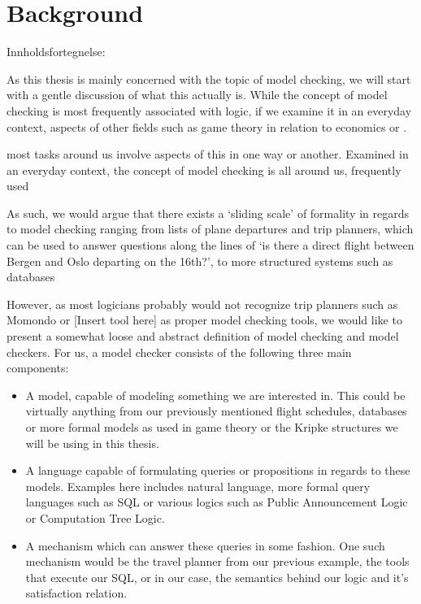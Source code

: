 \section{Background}\label{sec:back}

Innholdsfortegnelse:


As this thesis is mainly concerned with the topic of model checking, we will start with a gentle discussion of what this actually is. While the concept of model checking is most frequently associated with logic, if we examine it in an everyday context, aspects of other fields such as game theory in relation to economics or .


 most tasks around us involve aspects of this in one way or another. 
Examined in an everyday context, the concept of model checking is all around us, frequently used 

As such, we would argue that there exists a `sliding scale' of formality in regards to model checking ranging from lists of plane departures and trip planners, which can be used to answer questions along the lines of `is there a direct flight between Bergen and Oslo departing on the 16th?', to more structured systems such as databases 

However, as most logicians probably would not recognize trip planners such as Momondo or [Insert tool here] as proper model checking tools, we would like to present a somewhat loose and abstract definition of model checking and model checkers. For us, a model checker consists of the following three main components:

	\begin{itemize}
		\item{A model, capable of modeling something we are interested in. This could be virtually anything from our previously mentioned flight schedules, databases or more formal models as used in game theory or the Kripke structures we will be using in this thesis.}
		\item{A language capable of formulating queries or propositions in regards to these models. Examples here includes natural language, more formal query languages such as SQL or various logics such as Public Announcement Logic or Computation Tree Logic.}
		\item{A mechanism which can answer these queries in some fashion. One such mechanism would be the travel planner from our previous example, the tools that execute our SQL, or in our case, the semantics behind our logic and it's satisfaction relation. }
	\end{itemize}
	
